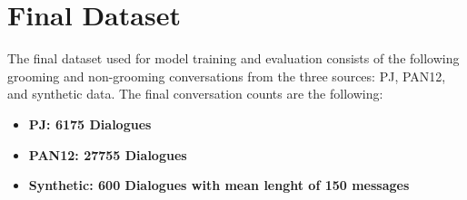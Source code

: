 \section{Final Dataset}

The final dataset used for model training and evaluation consists of the following grooming and non-grooming conversations from the three sources: PJ, PAN12, and synthetic data. The final conversation counts are the following:

\begin{itemize}
    \item \textbf{PJ: 6175 Dialogues}
    \item \textbf{PAN12: 27755 Dialogues}
    \item \textbf{Synthetic: 600 Dialogues with mean lenght of 150 messages}
\end{itemize}







